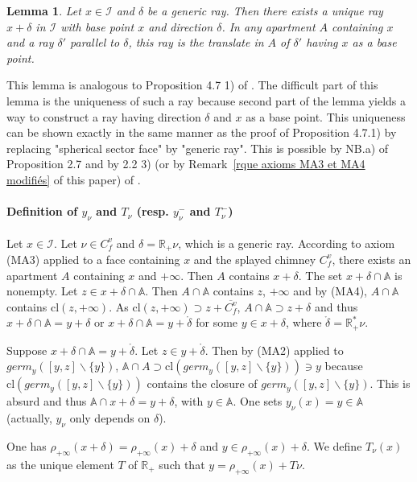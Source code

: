 \documentclass[12pt]{article}
\theoremstyle{plain}
\newtheorem{lemma}[theorem]{Lemma}
\theoremstyle{definition}
\newcommand{\R}{\mathbb{R}}
\newcommand{\A}{\mathbb{A}}
\newcommand{\I}{\mathcal{I}}
\begin{document}
\begin{lemma}\label{lemme demi-droite de base donnée}
Let $x\in \I$ and $\delta$ be a generic ray. Then there exists a unique ray $x+\delta$ in $\I$ with base point $x$ and direction $\delta$. In any apartment $A$ containing $x$ and a ray $\delta'$ parallel to $\delta$, this ray is the translate in $A$ of $\delta'$ having $x$ as a base point.
\end{lemma}

This lemma is analogous to Proposition 4.7 1) of \cite{rousseau2011masures}. The difficult part of this lemma is the uniqueness of such a ray because second part of the lemma yields a way to construct a ray having direction $\delta$ and $x$ as a base point. This uniqueness can be shown exactly in the same manner as the proof of Proposition 4.7.1) by replacing "spherical sector face" by "generic ray". This is possible by NB.a) of Proposition 2.7 and by 2.2 3) (or by Remark~\ref{rque axioms MA3 et MA4 modifiés} of this paper) of \cite{rousseau2011masures}.


\paragraph{Definition of $y_\nu$ and $T_\nu$ (resp. $y^-_\nu$ and $T^-_\nu$)}
Let $x\in \mathcal{I}$. Let $\nu \in C_f^v$ and $\delta=\R_+\nu$, which is a generic ray. According to axiom (MA3) applied to a face containing $x$ and the splayed chimney $C^v_f$, there exists an apartment $A$ containing $x$ and $+\infty$. Then $A$ contains $x+\delta$. The set $x+\delta\cap \A$ is nonempty. Let $z\in x+\delta\cap \A$. Then $A\cap \A$ contains $z$, $+\infty$ and by (MA4), $A\cap\A$ contains $\mathrm{cl}(z,+\infty)$. As $\mathrm{cl}(z,+\infty)\supset z+\overline{C_f^v}$,  $A\cap\A \supset z+\delta$ and thus $x+\delta\cap \A=y+\delta$ or $x+\delta\cap \A=y+\mathring{\delta}$ for some $y\in x+\delta$, where $\mathring \delta=\R^*_+\nu$.

 Suppose $x+\delta\cap \A=y+\mathring{\delta}$. Let $z\in y+\mathring{\delta}$. Then by (MA2) applied to $germ_y([y,z]\backslash\{y\})$, $\A\cap A\supset \mathrm{cl}(germ_y([y,z]\backslash\{y\}))\ni y$ because $\mathrm{cl}(germ_y([y,z]\backslash\{y\}))$ contains the closure of $germ_y([y,z]\backslash\{y\})$. This is absurd and thus $\A\cap x+\delta=y+\delta$, with $y\in \A$. One sets $y_\nu(x)=y\in\A$ (actually, $y_\nu$ only depends on $\delta$).

One has $\rho_{+\infty}(x+\delta)=\rho_{+\infty}(x)+\delta$ and $y\in \rho_{+\infty}(x)+\delta$. We define $T_\nu(x)$ as the unique element $T$ of $\mathbb{R}_+$ such that $y=\rho_{+\infty}(x)+T\nu$.
\end{document}
